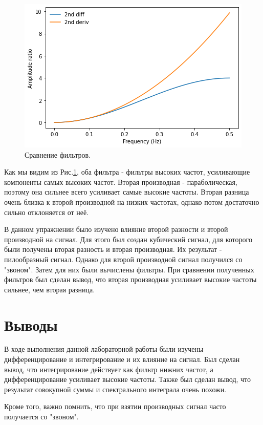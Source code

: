 \documentclass[a4paper, 14pt]{extarticle}
\begin{document}
    \begin{figure}[h]
        \centering
        \includegraphics[width=0.8\linewidth]{resources/Images/task5_compare_filters}
        \caption{Сравнение фильтров.}
        \label{fig:task5_compare_filters}
    \end{figure}

    Как мы видим из Рис.\ref{fig:task5_compare_filters}, оба фильтра - фильтры высоких частот, усиливающие компоненты
    самых высоких частот. Вторая производная - параболическая, поэтому она сильнее всего усиливает самые высокие частоты.
    Вторая разница очень близка к второй производной на низких частотах, однако потом достаточно сильно отклоняется от
    неё.

    В данном упражнении было изучено влияние второй разности и второй производной на сигнал. Для этого был создан
    кубический сигнал, для которого были получены вторая разность и вторая производная. Их результат - пилообразный
    сигнал. Однако для второй производной сигнал получился со "звоном". Затем для них были вычислены фильтры.
    При сравнении полученных фильтров был сделан вывод, что вторая производная усиливает высокие частоты сильнее, чем
    вторая разница.

    \newpage

    \section{Выводы}
    \label{sec:conclusions}

    В ходе выполнения данной лабораторной работы были изучены дифференцирование и интегрирование и их влияние на сигнал.
    Был сделан вывод, что интегрирование действует как фильтр нижних частот, а дифференцирование усиливает
    высокие частоты. Также был сделан вывод, что результат совокупной суммы и спектрального интеграла очень похожи.

    Кроме того, важно помнить, что при взятии производных сигнал часто получается со "звоном".
\end{document}
